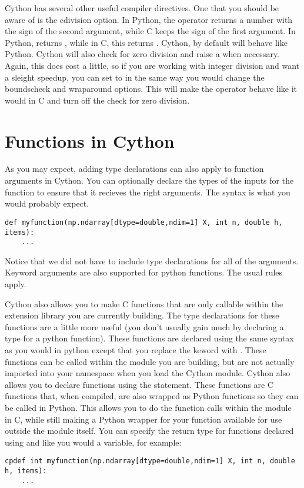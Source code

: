 Cython has several other useful compiler directives.
One that you should be aware of is the cdivision option.
In Python, the \li{\%} operator returns a number with the sign of the second argument, while C keeps the sign of the first argument.
In Python,  returns , while in C, this returns .
Cython, by default will behave like Python.
Cython will also check for zero division and raise a  when necessary.
Again, this does cost a little, so if you are working with integer division and want a sleight speedup, you can set  to  in the same way you would change the boundscheck and wraparound options.
This will make the \li{\%} operator behave like it would in C and turn off the check for zero division.

\section*{Functions in Cython}

As you may expect, adding type declarations can also apply to function arguments in Cython.
You can optionally declare the types of the inputs for the function to ensure that it recieves the right arguments.
The syntax is what you would probably expect.
\begin{lstlisting}
def myfunction(np.ndarray[dtype=double,ndim=1] X, int n, double h, items):
	...
\end{lstlisting}

Notice that we did not have to include type declarations for all of the arguments.
Keyword arguments are also supported for python functions.
The usual rules apply.

Cython also allows you to make C functions that are only callable within the extension library you are currently building.
The type declarations for these functions are a little more useful (you don't usually gain much by declaring a type for a python function).
These functions are declared using the same syntax as you would in python except that you replace the keword  with .
These functions can be called within the module you are building, but are not actually imported into your namespace when you load the Cython module.
Cython also allows you to declare functions using the  statement.
These functions are C functions that, when compiled, are also wrapped as Python functions so they can be called in Python.
This allows you to do the function calls within the module in C, while still making a Python wrapper for your function available for use outside the module itself.
You can specify the return type for functions declared using  and  like you would a variable, for example:
\begin{lstlisting}
cpdef int myfunction(np.ndarray[dtype=double,ndim=1] X, int n, double h, items):
	...
\end{lstlisting}

